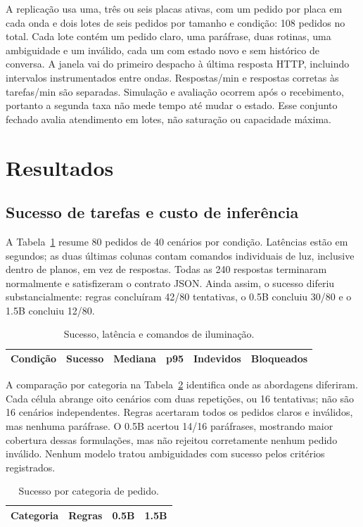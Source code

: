 \documentclass[letterpaper,conference]{IEEEtran}
\providecommand{\StudyPrefix}{}
\begin{document}
A replicação usa uma, três ou seis placas ativas, com um pedido por placa em cada onda e dois lotes de seis pedidos por tamanho e condição: 108 pedidos no total. Cada lote contém um pedido claro, uma paráfrase, duas rotinas, uma ambiguidade e um inválido, cada um com estado novo e sem histórico de conversa. A janela vai do primeiro despacho à última resposta HTTP, incluindo intervalos instrumentados entre ondas. Respostas/min e respostas corretas às tarefas/min são separadas. Simulação e avaliação ocorrem após o recebimento, portanto a segunda taxa não mede tempo até mudar o estado. Esse conjunto fechado avalia atendimento em lotes, não saturação ou capacidade máxima.

\section{Resultados}
\subsection{Sucesso de tarefas e custo de inferência}
A Tabela~\ref{tab:quality} resume 80 pedidos de 40 cenários por condição. Latências estão em segundos; as duas últimas colunas contam comandos individuais de luz, inclusive dentro de planos, em vez de respostas. Todas as 240 respostas terminaram normalmente e satisfizeram o contrato JSON. Ainda assim, o sucesso diferiu substancialmente: regras concluíram 42/80 tentativas, o 0.5B concluiu 30/80 e o 1.5B concluiu 12/80.
\begin{table}[t]\caption{Sucesso, latência e comandos de iluminação.}
\centering\footnotesize\setlength{\tabcolsep}{4pt}\begin{tabular}{lrrrrr}\toprule
Condição & Sucesso & Mediana & p95 & Indevidos & Bloqueados\\\midrule

\end{tabular}\label{tab:quality}\end{table}

A comparação por categoria na Tabela~\ref{tab:categories} identifica onde as abordagens diferiram. Cada célula abrange oito cenários com duas repetições, ou 16 tentativas; não são 16 cenários independentes. Regras acertaram todos os pedidos claros e inválidos, mas nenhuma paráfrase. O 0.5B acertou 14/16 paráfrases, mostrando maior cobertura dessas formulações, mas não rejeitou corretamente nenhum pedido inválido. Nenhum modelo tratou ambiguidades com sucesso pelos critérios registrados.
\begin{table}[t]\caption{Sucesso por categoria de pedido.}
\centering\footnotesize\begin{tabular}{lrrr}\toprule
Categoria & Regras & 0.5B & 1.5B\\\midrule

\end{tabular}\label{tab:categories}\end{table}
\end{document}
